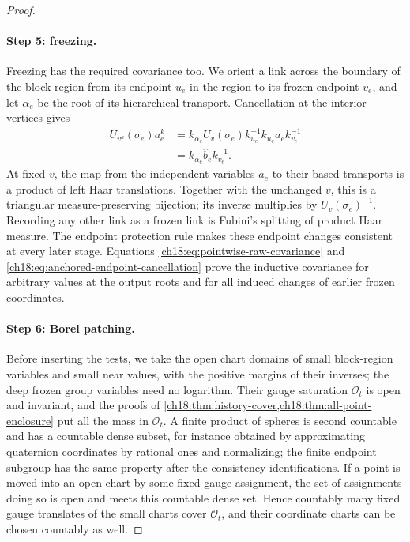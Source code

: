 \begin{proof}
\paragraph{Step 5: freezing.}
Freezing has the required covariance too. We orient a link across the boundary of the block region from its endpoint $u_e$ in the region to its frozen endpoint $v_e$, and let $\alpha_e$ be the root of its hierarchical transport. Cancellation at the interior vertices gives
\begin{equation}\label{ch18:eq:anchored-endpoint-cancellation}
 \begin{split}
 U_{v^k}(\sigma_e)a_e^k
 &=k_{\alpha_e}U_v(\sigma_e)k_{u_e}^{-1}
                 k_{u_e}a_e k_{v_e}^{-1}\\
 &=k_{\alpha_e}\widehat b_e k_{v_e}^{-1}.
 \end{split}
\end{equation}
At fixed $v$, the map from the independent variables $a_e$ to their based transports is a product of left Haar translations. Together with the unchanged $v$, this is a triangular measure-preserving bijection; its inverse multiplies by $U_v(\sigma_e)^{-1}$. Recording any other link as a frozen link is Fubini's splitting of product Haar measure. The endpoint protection rule makes these endpoint changes consistent at every later stage. Equations \eqref{ch18:eq:pointwise-raw-covariance} and \eqref{ch18:eq:anchored-endpoint-cancellation} prove the inductive covariance for arbitrary values at the output roots and for all induced changes of earlier frozen coordinates.

\paragraph{Step 6: Borel patching.}
Before inserting the tests, we take the open chart domains of small block-region variables and small near values, with the positive margins of their inverses; the deep frozen group variables need no logarithm. Their gauge saturation $\mathcal O_t$ is open and invariant, and the proofs of \cref{ch18:thm:history-cover,ch18:thm:all-point-enclosure} put all the mass in $\mathcal O_t$. A finite product of spheres is second countable and has a countable dense subset, for instance obtained by approximating quaternion coordinates by rational ones and normalizing; the finite endpoint subgroup has the same property after the consistency identifications. If a point is moved into an open chart by some fixed gauge assignment, the set of assignments doing so is open and meets this countable dense set. Hence countably many fixed gauge translates of the small charts cover $\mathcal O_t$, and their coordinate charts can be chosen countably as well.


\end{proof}
